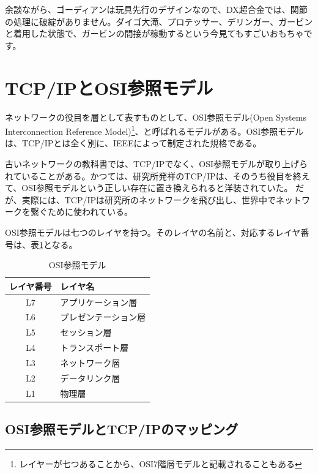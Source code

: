 余談ながら、ゴーディアンは玩具先行のデザインなので、DX超合金では、関節の処理に破綻がありません。ダイゴ大滝、プロテッサー、デリンガー、ガービンと着用した状態で、ガービンの間接が稼動するという今見てもすごいおもちゃです。


\section{TCP/IPとOSI参照モデル}
ネットワークの役目を層として表すものとして、OSI参照モデル(Open Systems Interconnection Reference Model)\footnote{レイヤーが七つあることから、OSI7階層モデルと記載されることもある}、と呼ばれるモデルがある。OSI参照モデルは、TCP/IPとは全く別に、IEEEによって制定された規格である。

古いネットワークの教科書では、TCP/IPでなく、OSI参照モデルが取り上げられていることがある。かつては、研究所発祥のTCP/IPは、そのうち役目を終えて、OSI参照モデルという正しい存在に置き換えられると洋装されていた。
だが、実際には、TCP/IPは研究所のネットワークを飛び出し、世界中でネットワークを繋ぐために使われている。

OSI参照モデルは七つのレイヤを持つ。そのレイヤの名前と、対応するレイヤ番号は、表\ref{osirm}となる。

\begin{table}[hbtp] 
\begin{center} \label{osirm}
	\begin{tabular}{cl} \toprule 
		レイヤ番号 & レイヤ名 \\ \midrule
		L7 & アプリケーション層 \\
		L6 & プレゼンテーション層 \\
		L5 & セッション層 \\
		L4 & トランスポート層 \\
		L3 & ネットワーク層 \\
		L2 & データリンク層 \\
		L1 & 物理層 \\ \bottomrule
	\end{tabular}
\end{center} \caption{OSI参照モデル}
\end{table} 

\subsection{OSI参照モデルとTCP/IPのマッピング}

